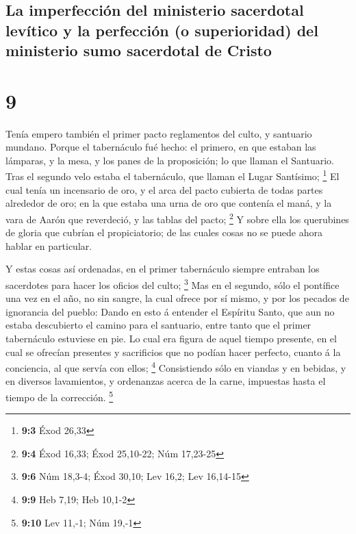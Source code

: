 \hypertarget{la-imperfecciuxf3n-del-ministerio-sacerdotal-levuxedtico-y-la-perfecciuxf3n-o-superioridad-del-ministerio-sumo-sacerdotal-de-cristo}{%
\subsection{La imperfección del ministerio sacerdotal levítico y la
perfección (o superioridad) del ministerio sumo sacerdotal de
Cristo}\label{la-imperfecciuxf3n-del-ministerio-sacerdotal-levuxedtico-y-la-perfecciuxf3n-o-superioridad-del-ministerio-sumo-sacerdotal-de-cristo}}

\hypertarget{section-8}{%
\section{9}\label{section-8}}

 Tenía empero también el primer pacto reglamentos del culto,
y santuario mundano.  Porque el tabernáculo fué hecho: el
primero, en que estaban las lámparas, y la mesa, y los panes de la
proposición; lo que llaman el Santuario.  Tras el segundo
velo estaba el tabernáculo, que llaman el Lugar Santísimo; \footnote{\textbf{9:3}
  Éxod 26,33}  El cual tenía un incensario de oro, y el arca
del pacto cubierta de todas partes alrededor de oro; en la que estaba
una urna de oro que contenía el maná, y la vara de Aarón que reverdeció,
y las tablas del pacto; \footnote{\textbf{9:4} Éxod 16,33; Éxod
  25,10-22; Núm 17,23-25}  Y sobre ella los querubines de
gloria que cubrían el propiciatorio; de las cuales cosas no se puede
ahora hablar en particular.

 Y estas cosas así ordenadas, en el primer tabernáculo
siempre entraban los sacerdotes para hacer los oficios del culto;
\footnote{\textbf{9:6} Núm 18,3-4; Éxod 30,10; Lev 16,2; Lev 16,14-15}
 Mas en el segundo, sólo el pontífice una vez en el año, no
sin sangre, la cual ofrece por sí mismo, y por los pecados de ignorancia
del pueblo:  Dando en esto á entender el Espíritu Santo, que
aun no estaba descubierto el camino para el santuario, entre tanto que
el primer tabernáculo estuviese en pie.  Lo cual era figura
de aquel tiempo presente, en el cual se ofrecían presentes y sacrificios
que no podían hacer perfecto, cuanto á la conciencia, al que servía con
ellos; \footnote{\textbf{9:9} Heb 7,19; Heb 10,1-2} 
Consistiendo sólo en viandas y en bebidas, y en diversos lavamientos, y
ordenanzas acerca de la carne, impuestas hasta el tiempo de la
corrección. \footnote{\textbf{9:10} Lev 11,-1; Núm 19,-1}


